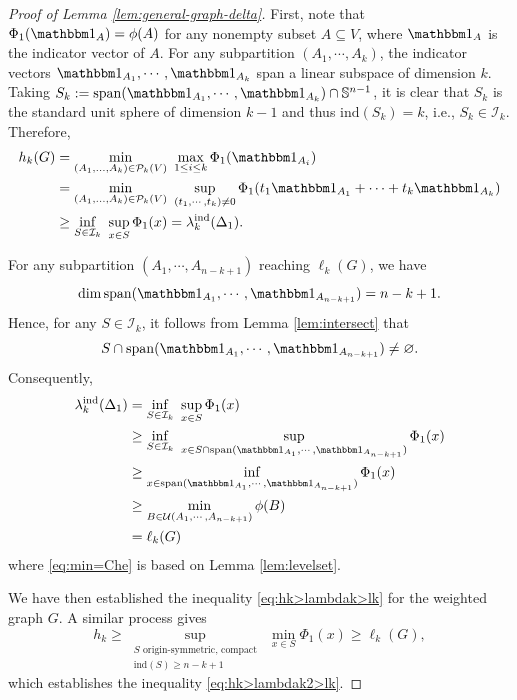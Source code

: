 \documentclass[12pt, reqno]{article}
\begin{document}
\begin{proof}[Proof of Lemma \ref{lem:general-graph-delta}]
First, note that $\Phi_1(\mathbbm 1_A)=\phi(A)$ for any nonempty subset $A\subseteq V$, where $\mathbbm 1_A$ is the indicator vector of $A$. For any subpartition $(A_1,\cdots,A_k)$, the indicator vectors $\mathbbm 1_{A_1},\cdots,\mathbbm 1_{A_k}$ span a linear subspace of dimension $k$. Taking $S_k:=\mathrm{span}(\mathbbm 1_{A_1},\cdots,\mathbbm 1_{A_k})\cap\mathbb{S}^{n-1}$, it is clear that $S_k$ is the standard unit sphere of dimension $k-1$ and thus $\mathrm{ind}(S_k)=k$, i.e., $S_k\in\mathcal{I}_k$. 
Therefore, 
\begin{align*}
h_k(G)&=\min_{(A_1,\dots,A_k)\in\mathcal P_k(V)}~\max_{1\le i\le k}\Phi_1(\mathbbm 1_{A_i})
\\&=\min_{(A_1,\dots,A_k)\in\mathcal P_k(V)}~\sup_{(t_1,\cdots,t_k)\ne0}\Phi_1(t_1\mathbbm 1_{A_1}+\cdots+t_k\mathbbm 1_{A_k})
\\&\ge \inf_{S\in\mathcal{I}_k}~\sup_{x\in S}\Phi_1(x) =\lambda_k^{\mathrm{ind}}(\Delta_1).  
\end{align*}

For any subpartition $(A_1,\cdots,A_{n-k+1})$ reaching $\ell_k(G)$, we have \[\dim \mathrm{span}(\mathbbm 1_{A_1},\cdots,\mathbbm 1_{A_{n-k+1}})=n-k+1.\] Hence, for any $S\in\mathcal{I}_k$, it follows from Lemma \ref{lem:intersect} that $$S\cap \mathrm{span}(\mathbbm 1_{A_1},\cdots,\mathbbm 1_{A_{n-k+1}})\ne\varnothing.$$ Consequently, 
\begin{align}
\lambda_k^{\mathrm{ind}}(\Delta_1)&=\inf_{S\in\mathcal{I}_k}~\sup_{x\in S}\Phi_1(x) \notag
\\&\ge     \inf_{S\in\mathcal{I}_k}~\sup_{x\in S\cap \mathrm{span}(\mathbbm 1_{A_1},\cdots,\mathbbm 1_{A_{n-k+1}})}\Phi_1(x)  \notag
\\&\ge \inf_{x\in \mathrm{span}(\mathbbm 1_{A_1},\cdots,\mathbbm 1_{A_{n-k+1}})}\Phi_1(x) \notag
\\&\ge\min_{B\in \mathcal{U}(A_1,\cdots,A_{n-k+1})}\phi(B) %
\label{eq:min=Che}
\\&=\ell_k(G) \notag
\end{align}
where \eqref{eq:min=Che} is based on Lemma \ref{lem:levelset}. %

We have then established the inequality 
\eqref{eq:hk>lambdak>lk}
for the weighted graph $G$. 
A similar process gives 
$$h_k\ge \sup_{\substack{S\text{ origin-symmetric, compact}\\\mathrm{ind}(S)\ge n-k+1}}~\min_{x\in S}\Phi_1(x)\ge \ell_k(G),$$
which establishes the inequality 
\eqref{eq:hk>lambdak2>lk}.
\end{proof}
\end{document}
